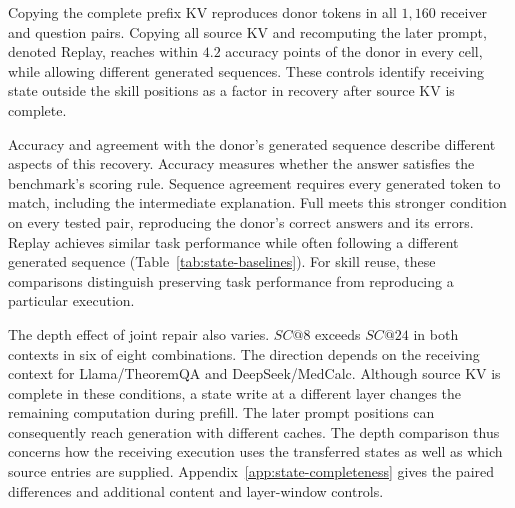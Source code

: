 Copying the complete prefix KV reproduces donor tokens in all $1{,}160$
receiver and question pairs. Copying all source KV and recomputing the
later prompt, denoted Replay, reaches within $4.2$ accuracy points of the
donor in every cell, while allowing different generated sequences.
These controls identify receiving state outside the skill positions as a
factor in recovery after source KV is complete.

Accuracy and agreement with the donor's generated sequence describe
different aspects of this recovery. Accuracy measures whether the answer
satisfies the benchmark's scoring rule. Sequence agreement requires every
generated token to match, including the intermediate explanation.
Full meets this stronger condition on every tested pair, reproducing the
donor's correct answers and its errors. Replay achieves similar task
performance while often following a different generated sequence
(Table~\ref{tab:state-baselines}). For skill reuse, these comparisons distinguish
preserving task performance from reproducing a particular execution.

The depth effect of joint repair also varies. $SC@8$ exceeds $SC@24$ in
both contexts in six of eight combinations. The direction depends on the
receiving context for Llama/TheoremQA and DeepSeek/MedCalc.
Although source KV is complete in these conditions, a state write at a
different layer changes the remaining computation during prefill. The
later prompt positions can consequently reach generation with different
caches. The depth comparison thus concerns how the receiving execution
uses the transferred states as well as which source entries are supplied.
Appendix~\ref{app:state-completeness} gives the paired differences and
additional content and layer-window controls.


